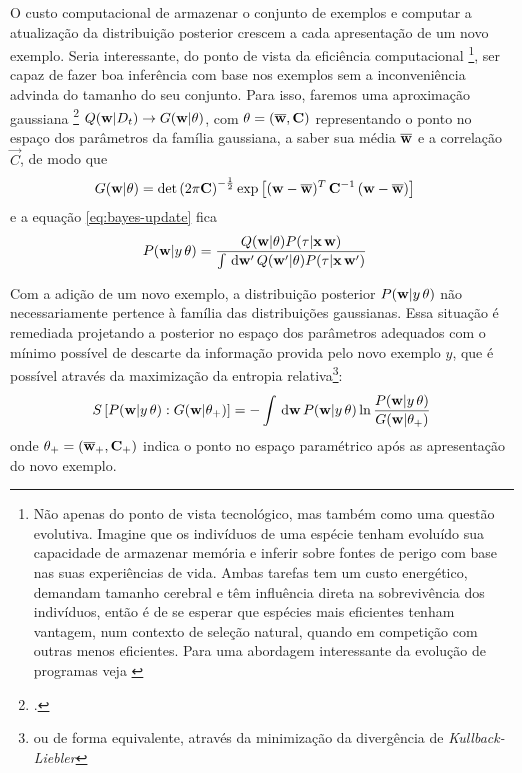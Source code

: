 \newcommand{\Ct}{\ensuremath{\vec{C}}}
\newcommand{\CT}{\ensuremath{\Ct_+}}
\newcommand{\At}{\ensuremath{\theta}}
\newcommand{\AT}{\ensuremath{\At_+}}
O custo computacional de armazenar o conjunto de exemplos e computar a atualização da distribuição posterior crescem a cada apresentação de um novo exemplo.
Seria interessante, do ponto de vista da eficiência computacional \footnote[][-4cm]{Não apenas do ponto de vista tecnológico, mas também como uma   questão evolutiva.
Imagine que os indivíduos de uma espécie tenham evoluído   sua capacidade de armazenar memória e inferir sobre fontes de perigo com base nas suas experiências de vida.
Ambas tarefas tem um custo energético, demandam tamanho cerebral e têm influência direta na sobrevivência dos indivíduos, então é de se esperar que espécies mais eficientes tenham vantagem, num contexto de seleção natural, quando em competição com outras menos eficientes.
Para uma abordagem interessante da evolução de programas veja \parencite{Neirotti2003,Neirotti2006}}, ser capaz de fazer boa inferência com base nos exemplos sem a inconveniência advinda do tamanho do seu conjunto.
Para isso, faremos uma aproximação gaussiana \footcite{Solla1999,Opper1996} $Q(\rl|\Dt) \to G(\rl|\At)$, com $\At = (\wt,\Ct)$ representando o ponto no espaço dos parâmetros da família gaussiana, a saber sua média $\overline{\mathbf{w}}$ e a correlação $\Ct$, de modo que
\abovedisplayskip=8pt
\belowdisplayskip=8pt
\begin{align*}
  G(\rl|\At) & = \det \inpr{{2\pi \Ct}} ^ {-\half}
               \exp \inbk{{(\rl-\wt)^T \,\Ct ^ {-1}\,(\rl-\wt)}}
\end{align*}
e a equação \eqref{eq:bayes-update} fica
\begin{align}\label{eq:bayes-up-approx}
    P(\rl|y\,\At) & = \frac{Q(\rl|\At)P(\tau|\vec{x}\,\rl)}
             {\int \msr{\rl'} Q(\rl'|\At)P(\tau|\vec{x}\,\rl')}
\end{align}

Com a adição de um novo exemplo, a distribuição posterior $P(\rl|y\,\At)$ não necessariamente pertence à família das distribuições gaussianas.
Essa situação é remediada projetando a posterior no espaço dos parâmetros adequados com o mínimo possível de descarte da informação provida pelo novo exemplo $y$, que é possível através da maximização da entropia relativa\footnote{ou de forma equivalente, através da minimização da divergência de   \emph{Kullback-Liebler}}:
\abovedisplayskip=8pt
\belowdisplayskip=8pt
\begin{equation}
  \label{eq:entropy}
  S \inbk{P(\rl|y\,\At):G(\rl|\AT)} =
        -\int \msr{\rl} P(\rl|y\,\At) \ln \frac{P(\rl|y\,\At)}
                                               {G(\rl|\AT)}
\end{equation}
onde $\AT = (\wT,\CT)$ indica o ponto no espaço paramétrico após as apresentação do novo exemplo.

